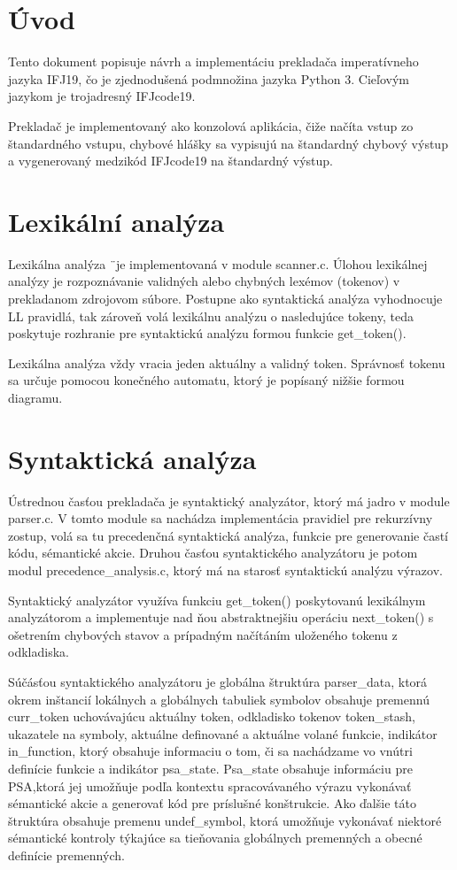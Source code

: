 \documentclass{article}
\begin{document}
	\section{Úvod}
	\large{Tento dokument popisuje návrh a implementáciu prekladača imperatívneho jazyka IFJ19, čo je zjednodušená podmnožina jazyka Python 3. Cieľovým jazykom je trojadresný IFJcode19. 
	
	Prekladač je implementovaný ako konzolová aplikácia, čiže načíta vstup zo štandardného vstupu, chybové hlášky sa vypisujú na štandardný chybový výstup a vygenerovaný medzikód IFJcode19 na štandardný výstup.}
	\newpage
	\section{Lexikální analýza}
	Lexikálna analýza ¨je implementovaná v module scanner.c. Úlohou lexikálnej analýzy je rozpoznávanie validných alebo chybných lexémov (tokenov) v prekladanom zdrojovom súbore. Postupne ako syntaktická analýza vyhodnocuje LL pravidlá, tak zároveň volá lexikálnu analýzu o nasledujúce tokeny, teda poskytuje rozhranie pre syntaktickú analýzu formou funkcie get\_token().
	
	Lexikálna analýza vždy vracia jeden aktuálny a validný token. Správnosť tokenu sa určuje pomocou konečného automatu, ktorý je popísaný nižšie formou diagramu.

	\section{Syntaktická analýza}
	Ústrednou časťou prekladača je syntaktický analyzátor, ktorý má jadro v module parser.c. V tomto module sa nachádza implementácia pravidiel pre rekurzívny zostup, volá sa tu precedenčná syntaktická analýza, funkcie pre generovanie častí kódu, sémantické akcie. Druhou časťou  syntaktického analyzátoru je potom modul precedence\_analysis.c, ktorý má na starosť syntaktickú analýzu výrazov.
	
	Syntaktický analyzátor využíva funkciu get\_token() poskytovanú lexikálnym analyzátorom a implementuje nad ňou abstraktnejšiu operáciu next\_token() s ošetrením chybových stavov a prípadným načítáním uloženého tokenu z odkladiska.
	
	Súčásťou syntaktického analyzátoru je globálna štruktúra parser\_data, ktorá okrem inštancií lokálnych a globálnych tabuliek symbolov obsahuje premennú curr\_token uchovávajúcu  aktuálny token, odkladisko tokenov token\_stash, ukazatele na symboly, aktuálne definované a aktuálne volané funkcie, indikátor in\_function, ktorý obsahuje informaciu o tom, či sa nachádzame vo vnútri definície funkcie a indikátor psa\_state. Psa\_state obsahuje informáciu pre PSA,ktorá jej umožňuje podľa kontextu spracovávaného výrazu vykonávať sémantické akcie a generovať kód pre príslušné konštrukcie. Ako ďalšie táto štruktúra obsahuje premenu undef\_symbol, ktorá umožňuje vykonávať niektoré sémantické kontroly týkajúce sa tieňovania globálnych premenných a obecné definície premenných.
	
\end{document}
